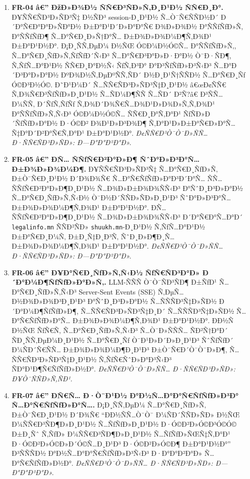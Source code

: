 \documentclass[12pt,A4]{report}
\begin{document}
\begin{enumerate}
  \item \textbf{FR-04 â€” ÐžÐ»Ð¾Ð½ ÑÑ€Ð³ÑÐ»Ñ‚Ð¸Ð¹Ð½ ÑÑ€Ð¸Ð°.}
        Ð¥ÑÑ€ÑÐ³Ð»ÑÐ³Ñ‡ Ð½ÑÐ³ session-Ð¸Ð¹Ð½ Ñ…Ò¯Ñ€ÑÑÐ½Ð´ Ð´Ð°Ñ€Ð°Ð°Ð»ÑÐ°Ð½ Ð±Ð°Ð¹Ð´Ð»Ð°Ð°Ñ€ Ð¾Ð»Ð¾Ð½ Ð°ÑÑƒÑƒÐ»Ñ‚ Ð°ÑÑƒÑƒÐ¶ Ñ…Ð°Ñ€Ð¸Ð»Ñ†Ð°Ñ… Ð±Ð¾Ð»Ð¾Ð¼Ð¶Ñ‚Ð¾Ð¹ Ð±Ð°Ð¹Ð½Ð°. Ð¡Ð¸ÑÑ‚ÐµÐ¼ Ð½ÑŒ Ó©Ð¼Ð½Ó©Ñ… Ð°ÑÑƒÑƒÐ»Ñ‚, Ñ…Ð°Ñ€Ð¸ÑƒÐ»Ñ‚ÑƒÑƒÐ´Ñ‹Ð³ Ñ…Ð°Ñ€Ð³Ð°Ð»Ð·Ð°Ð½ Ò¯Ð·ÑÐ¶, Ñ‚ÑƒÑ…Ð°Ð¹Ð½ ÑÑ€Ð¸Ð°Ð½Ñ‹ ÑƒÑ‚Ð³Ð° Ð°Ð³ÑƒÑƒÐ»Ð³Ñ‹Ð³ Ñ…Ð°Ð´Ð³Ð°Ð»Ð°Ð½ ÐºÐ¾Ð½Ñ‚ÐµÐºÑÑ‚ÑÐ´ Ð½Ð¸Ð¹Ñ†ÑÑÐ½ Ñ…Ð°Ñ€Ð¸Ñƒ Ó©Ð³Ð½Ó©. Ð˜Ð¹Ð¼Ð´ Ñ…ÑÑ€ÑÐ³Ð»ÑÐ³Ñ‡Ð¸Ð¹Ð½ â€œÐ¢ÑÑ€ Ñ‚Ð¾Ñ€Ð³ÑƒÑƒÐ»Ð¸Ð¹Ð½ Ñ…ÑÐ¼Ð¶ÑÑ Ñ…ÑÐ´ Ð²Ñ?â€ Ð³ÑÑ… Ð¼ÑÑ‚ Ð´ÑƒÑ‚ÑƒÑƒ Ñ‚Ð¾Ð´Ð¾Ñ€Ñ…Ð¾Ð¹Ð»Ð¾Ð»Ñ‚Ñ‚Ð¾Ð¹ Ð°ÑÑƒÑƒÐ»Ñ‚Ñ‹Ð³ Ó©Ð¼Ð½Ó©Ñ… ÑÑ€Ð¸Ð°Ñ‚Ð°Ð¹ ÑƒÑÐ»Ð´ÑƒÑƒÐ»Ð°Ð½ Ð·Ó©Ð² Ð¾Ð¹Ð»Ð³Ð¾Ð¶ Ñ‚Ð°Ð¹Ð»Ð±Ð°Ñ€Ð»Ð°Ñ… Ñ‡Ð°Ð´Ð²Ð°Ñ€Ñ‚Ð°Ð¹ Ð±Ð°Ð¹Ð½Ð°.
        \textit{Ð¢ÑÑ€Ð³Ò¯Ò¯Ð»ÑÑ… Ð·ÑÑ€ÑÐ³Ð»ÑÐ»: Ð—Ð°Ð°Ð²Ð°Ð».}

  \item \textbf{FR-05 â€” Ð­Ñ… ÑÑƒÑ€Ð²Ð°Ð»Ð¶ ÑˆÐ°Ð»Ð³Ð°Ñ… Ð±Ð¾Ð»Ð¾Ð¼Ð¶.}
        Ð¥ÑÑ€ÑÐ³Ð»ÑÐ³Ñ‡ Ñ…Ð°Ñ€Ð¸ÑƒÐ»Ñ‚ Ð±Ò¯Ñ€Ð¸Ð¹Ð½ Ð´Ð¾Ð¾Ñ€ Ñ…Ð°Ñ€ÑƒÑƒÐ»Ð°Ð³Ð´Ð°Ñ…
        ÑÑ… ÑÑƒÑ€Ð²Ð°Ð»Ð¶Ð¸Ð¹Ð½ Ñ…Ð¾Ð»Ð±Ð¾Ð¾ÑÑ‹Ð³ Ð°ÑˆÐ¸Ð³Ð»Ð°Ð½ Ñ…Ð°Ñ€Ð¸ÑƒÐ»Ñ‚Ñ‹Ð½
        Ò¯Ð½Ð´ÑÑÐ»ÑÐ»Ð¸Ð¹Ð³ ÑˆÐ°Ð»Ð³Ð°Ñ… Ð±Ð¾Ð»Ð¾Ð¼Ð¶Ñ‚Ð¾Ð¹ Ð±Ð°Ð¹Ð½Ð°. Ð­Ñ…
        ÑÑƒÑ€Ð²Ð°Ð»Ð¶Ð¸Ð¹Ð½ Ñ…Ð¾Ð»Ð±Ð¾Ð¾ÑÑ‹Ð³ Ð´Ð°Ñ€Ð°Ñ…Ð°Ð´ \texttt{legalinfo.mn}
        ÑÑÐ²ÑÐ» \texttt{shuukh.mn}-Ð¸Ð¹Ð½ Ñ‚ÑƒÑ…Ð°Ð¹Ð½ Ð±Ð°Ñ€Ð¸Ð¼Ñ‚
        Ð±Ð¸Ñ‡Ð¸Ð³Ñ‚ ÑˆÐ¸Ð»Ð¶Ð¸Ñ… Ð±Ð¾Ð»Ð¾Ð¼Ð¶Ñ‚Ð¾Ð¹ Ð±Ð°Ð¹Ð½Ð°.
        \textit{Ð¢ÑÑ€Ð³Ò¯Ò¯Ð»ÑÑ… Ð·ÑÑ€ÑÐ³Ð»ÑÐ»: Ð—Ð°Ð°Ð²Ð°Ð».}

  \item \textbf{FR-06 â€” Ð¥Ð°Ñ€Ð¸ÑƒÐ»Ñ‚Ñ‹Ð½ ÑƒÑ€ÑÐ³Ð°Ð» Ð´Ð°Ð¼Ð¶ÑƒÑƒÐ»Ð°Ð»Ñ‚.}
        LLM-ÑÑÑ Ò¯Ò¯ÑÐ³ÑÐ¶ Ð±ÑƒÐ¹ Ñ…Ð°Ñ€Ð¸ÑƒÐ»Ñ‚Ñ‹Ð³ Server-Sent Events (SSE) Ñ‚ÐµÑ…Ð½Ð¾Ð»Ð¾Ð³Ð¸Ð¹Ð³ Ð°ÑˆÐ¸Ð³Ð»Ð°Ð½ Ñ…ÑÑÑÐ³Ñ‡Ð»ÑÐ½ Ð´Ð°Ð¼Ð¶ÑƒÑƒÐ»Ð¶, Ñ…ÑÑ€ÑÐ³Ð»ÑÐ³Ñ‡Ð¸Ð´ Ñ…ÑÑÑÐ³Ñ‡Ð»ÑÐ½ Ñ…Ð°Ñ€ÑƒÑƒÐ»Ð°Ñ… Ð±Ð¾Ð»Ð¾Ð¼Ð¶Ñ‚Ð¾Ð¹ Ð±Ð°Ð¹Ð½Ð°. Ð­Ð½Ñ Ð½ÑŒ ÑƒÑ€Ñ‚ Ñ…Ð°Ñ€Ð¸ÑƒÐ»Ñ‚Ñ‹Ð³ Ñ…Ò¯Ð»ÑÑÑ… ÑÐ²Ñ†Ð°Ð´ ÑÐ¸ÑÑ‚ÐµÐ¼Ð¸Ð¹Ð½ Ñ…Ð°Ñ€Ð¸Ñƒ Ò¯Ð¹Ð»Ð´Ð»Ð¸Ð¹Ð³ ÑˆÑƒÑƒÐ´ Ð¼ÑÐ´Ñ€ÑÑ… Ð±Ð¾Ð»Ð¾Ð¼Ð¶Ð¸Ð¹Ð³ Ð±Ò¯Ñ€Ð´Ò¯Ò¯Ð»Ð¶, Ñ…ÑÑ€ÑÐ³Ð»ÑÐ³Ñ‡Ð¸Ð¹Ð½ Ñ‚ÑƒÑ€ÑˆÐ»Ð°Ð³Ñ‹Ð³ ÑÐ°Ð¹Ð¶Ñ€ÑƒÑƒÐ»Ð½Ð°.
        \textit{Ð¢ÑÑ€Ð³Ò¯Ò¯Ð»ÑÑ… Ð·ÑÑ€ÑÐ³Ð»ÑÐ»: Ð¥Ò¯ÑÑÐ»Ñ‚ÑÐ¹.}

  \item \textbf{FR-07 â€” Ð­Ñ€Ñ… Ð·Ò¯Ð¹Ð½ Ð°Ð½Ñ…Ð°Ð°Ñ€ÑƒÑƒÐ»Ð³Ð° Ñ…Ð°Ñ€ÑƒÑƒÐ»Ð°Ñ….}
        Ð¡Ð¸ÑÑ‚ÐµÐ¼ Ñ…Ð°Ñ€Ð¸ÑƒÐ»Ñ‚ Ð±Ò¯Ñ€Ð¸Ð¹Ð½ Ð´Ð¾Ñ€ ``Ð­Ð½ÑÑ…Ò¯Ò¯ Ð¼ÑÐ´ÑÑÐ»ÑÐ»
        Ð½ÑŒ Ð¼ÑÑ€Ð³ÑÐ¶Ð»Ð¸Ð¹Ð½ Ñ…ÑƒÑƒÐ»Ð¸Ð¹Ð½ Ð·Ó©Ð²Ð»Ó©Ð³Ó©Ó© Ð±Ð¸Ñˆ Ñ‚ÑƒÐ»
        Ð¼ÑÑ€Ð³ÑÐ¶Ð»Ð¸Ð¹Ð½ Ñ…ÑƒÑƒÐ»ÑŒÑ‡Ñ‚Ð°Ð¹ Ð·Ó©Ð²Ð»Ó©Ð»Ð´Ó©Ñ…Ð¸Ð¹Ð³ Ð·Ó©Ð²Ð»Ó©Ð¶
        Ð±Ð°Ð¹Ð½Ð°'' Ð³ÑÑÑÐ½ Ð°Ð½Ñ…Ð°Ð°Ñ€ÑƒÑƒÐ»Ð³Ñ‹Ð³ Ð·Ð°Ð°Ð²Ð°Ð» Ñ…Ð°Ñ€ÑƒÑƒÐ»Ð½Ð°.
        \textit{Ð¢ÑÑ€Ð³Ò¯Ò¯Ð»ÑÑ… Ð·ÑÑ€ÑÐ³Ð»ÑÐ»: Ð—Ð°Ð°Ð²Ð°Ð».}

\end{enumerate}
\end{document}
